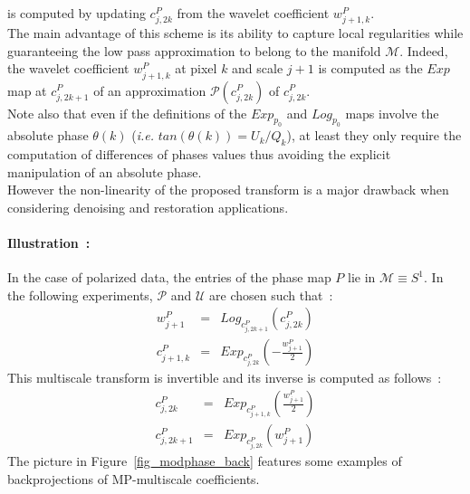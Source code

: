 is computed by updating $c_{j,2k}^P$ from the wavelet coefficient $w_{j+1,k}^P$.\\
The main advantage of this scheme is its ability to capture local regularities while guaranteeing the low pass approximation to belong to 
the manifold $\mathcal{M}$. Indeed, the wavelet coefficient $w_{j+1,k}^P$ at pixel $k$ and scale $j+1$ is computed as the $Exp$ map at 
$c_{j,2k+1}^P$ of an approximation $\mathcal{P}(c_{j,2k}^P)$ of $c_{j,2k}^P$.\\
Note also that even if the definitions of the $Exp_{p_0}$ and $Log_{p_0}$ maps involve the absolute phase $\theta(k)$ (\textit{i.e.} $tan(\theta(k)) = U_k/Q_k$), 
at least they only require the computation of differences of phases values thus avoiding the explicit manipulation of an absolute phase.\\
However the non-linearity of the proposed transform is a major drawback when considering denoising and restoration applications.\\ 

\paragraph{Illustration~:\\}
In the case of polarized data, the entries of the phase map $P$ lie in $\mathcal{M} \equiv S^1$. In the following experiments, $\mathcal{P}$ and $\mathcal{U}$ are chosen such that~:
\begin{eqnarray}
w_{j+1}^P & = & Log_{c_{j,2k+1}^P}(c_{j,2k}^P)  \\
c_{j+1,k}^P & = & Exp_{c_{j,2k}^P} \left( - \frac{w_{j+1}^P}{2}\right)
\end{eqnarray}
This multiscale transform is invertible and its inverse is computed as follows~:
\begin{eqnarray}
c_{j,2k}^P & = & Exp_{c_{j+1,k}^P} \left(\frac{w_{j+1}^P}{2}\right)\\
c_{j,2k+1}^P & = & Exp_{c_{j,2k}^P}\left( w_{j+1}^P \right)   
\end{eqnarray}
The picture in Figure~\ref{fig_modphase_back} features some examples of backprojections of MP-multiscale coefficients.

